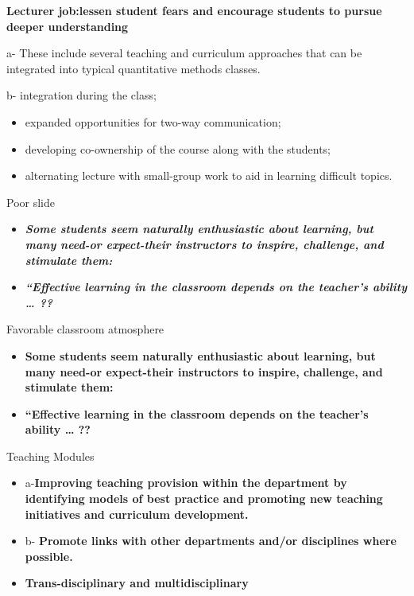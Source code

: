 \documentclass[
  ignorenonframetext,
]{beamer}
\begin{document}
\begin{frame}{}
\protect\hypertarget{section-4}{}
\textbf{Lecturer job:lessen student fears and encourage students to
pursue deeper understanding}

a- {These include several teaching and curriculum approaches that can be
integrated into typical quantitative methods classes.}

b- integration during the class;

\begin{itemize}[<+->]
\item
  expanded opportunities for two-way communication;
\item
  developing co-ownership of the course along with the students;
\item
  alternating lecture with small-group work to aid in learning difficult
  topics.
\end{itemize}
\end{frame}

\begin{frame}{Poor slide}
\protect\hypertarget{poor-slide}{}
\begin{itemize}[<+->]
\item
  {\textbf{\emph{Some students seem naturally enthusiastic about
  learning, but many need-or expect-their instructors to inspire,
  challenge, and stimulate them:}}}
\item
  {\textbf{\emph{``Effective learning in the classroom depends on the
  teacher's ability \ldots{} ??}}}
\end{itemize}
\end{frame}

\begin{frame}{Favorable classroom atmosphere}
\protect\hypertarget{favorable-classroom-atmosphere}{}
\begin{itemize}[<+->]
\item
  \textbf{Some students seem naturally enthusiastic about learning, but
  many need-or expect-their instructors to {inspire, challenge, and
  stimulate} them:}
\item
  {\textbf{``Effective learning in the classroom depends on the
  teacher's ability \ldots{} ??}}
\end{itemize}
\end{frame}

\begin{frame}{Teaching Modules}
\protect\hypertarget{teaching-modules}{}
\begin{itemize}[<+->]
\item
  a-\textbf{Improving teaching provision within the department by
  identifying models of best practice and promoting new teaching
  initiatives and curriculum development.}
\item
  b- \textbf{Promote links with other departments and/or disciplines
  where possible.}
\item
  {\textbf{Trans-disciplinary and multidisciplinary}}
\end{itemize}
\end{frame}
\end{document}
